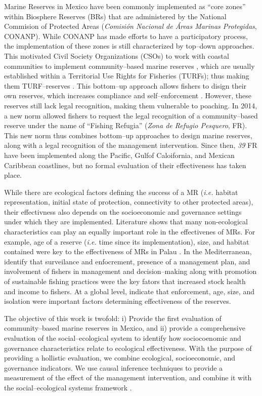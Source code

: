 \documentclass{frontiersSCNS}
\theoremstyle{definition}
\theoremstyle{definition}
\theoremstyle{definition}
\theoremstyle{remark}
\begin{document}
Marine Reserves in Mexico have been commonly implemented as ``core
zones'' within Biosphere Reserves (BRs) that are administered by the
National Commision of Protected Areas (\emph{Comisión Nacional de Áreas
Marinas Protegidas}, CONANP). While CONANP has made efforts to have a
participatory process, the implementation of these zones is still
characterized by top--down approaches. This motivated Civil Society
Organizations (CSOs) to work with coastal communities to implement
community--based marine reserves \citep{uribe_2010-u2}, which are
usually established within a Territorial Use Rights for Fisheries
(TURFs); thus making them TURF--reserves \citep{afflerbach_2014-HP}.
This bottom--up approach allows fishers to disign their own reserves,
which increases compliance and self--enforcement
\citep{gelcich_2015-Gw,espinosaromero_2014-PY,beger_2004-Y8}. However,
these reserves still lack legal recognition, making them vulnerable to
poaching. In 2014, a new norm \citep{nom} allowed fishers to request the
legal recognition of a community--based reserve under the name of
``Fishing Refugia'' (\emph{Zona de Refugio Pesquero}, FR). This new norm
thus combines bottom--up approaches to design marine reserves, along
with a legal recognition of the management intervention. Since then,
\emph{39} FR have been implemented along the Pacific, Gulfof
Caloifornia, and Mexican Caribbean coastlines, but no formal evaluation
of their effectiveness has taken place.

While there are ecological factors defining the success of a MR
(\emph{i.e.} habitat representation, initial state of protection,
connectivity to other protected areas), their effectivness also depends
on the socioeconomic and governance settings under which they are
implemented. Literature shows that many non-ecological characteristics
can play an equally important role in the effectivenes of MRs. For
example, age of a reserve (\emph{i.e.} time since its implementation),
size, and habitat contained were key to the effectiveness of MRs in
Palau \citep{friedlander_2017-oI}. In the Mediterranean,
\citet{difranco_2016-Xw} identify that surveilance and enfocrement,
presence of a management plan, and involvement of fishers in management
and decision--making along with promotion of sustainable fishing
practices were the key fators that increased stock health and income to
fishers. At a global level, \citet{edgar_2014-UO} indicate that
enforcement, age, size, and isolation were important factors determining
effectiveness of the reserves.

The objective of this work is twofold: i) Provide the first evaluation
of community--based marine reserves in Mexico, and ii) provide a
comprehensive evaluation of the social--ecological system to identify
how sociocoenomic and governance characteristics relate to ecological
effectiveness. With the purpose of providing a hollistic evaluation, we
combine ecological, socioeconomic, and governance indicators. We use
causal inference techniques to provide a measurement of the effect of
the management intervention, and combine it with the social--ecological
systems framework \citep{ostrom_2009-hg}.
\end{document}
